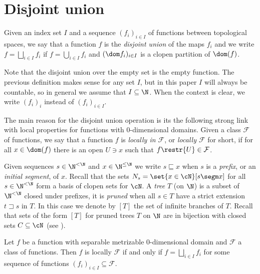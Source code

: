\section{Disjoint union}


\begin{definition}
Given an index set $I$ and a sequence $(f_i)_{i\in I}$ of functions between topological spaces,
we say that a function $f$ is the \emph{disjoint union} of the maps $f_i$ and we write $f=\bigsqcup_{i\in I} f_i$
if $f=\bigcup_{i\in I}f_i$ and $(\dom f_i)_{i\in I}$ is a clopen partition of $\dom(f)$.
\end{definition}

Note that the disjoint union over the empty set is the empty function.
The previous definition makes sense for any set $I$, but in this paper $I$ will always be countable, so in general we assume that $I\subseteq \N$.
When the context is clear, we write $(f_i)_i$ instead of $(f_i)_{i\in I}$.

The main reason for the disjoint union operation is its the following strong link with local properties for functions with $0$-dimensional domains.
Given a class $\mathcal{F}$ of functions, we say that a function $f$ is \emph{locally in $\mathcal{F}$}, or \emph{locally $\mathcal{F}$} for short,
if for all $x\in\dom(f)$ there is an open $U\ni x$ such that $f\restr{U}\in\mathcal{F}$.

Given sequences $s\in\N^{<\N}$ and $x\in\N^{\leq\N}$ we write $s\sqsubseteq x$ when $s$ is a \emph{prefix}, or an \emph{initial segment}, of $x$.
Recall that the sets $N_{s}=\set{x\in\cN}[s\segm x]$ for all $s\in\N^{<\N}$ form a basis of clopen sets for $\cN$.
A \emph{tree} $T$ (on $\N$) is a subset of $\N^{<\N}$ closed under prefixes, it is \emph{pruned} when all $s\in T$ have a strict extension $t\sqsupset s$ in $T$.
In this case we denote by $[T]$ the set of infinite branches of $T$.
Recall that sets of the form $[T]$ for pruned trees $T$ on $\N$ are in bijection with closed sets $C\subseteq\cN$ (see \cite[(2.4)]{kechris}).

\begin{proposition}\label{0dimanddisjointunion}
Let $f$ be a function with separable metrizable 0-dimensional domain and $\mathcal{F}$ a class of functions.
Then $f$ is locally $\mathcal{F}$ if and only if $f=\bigsqcup_{i\in I}f_i$ for some sequence of functions $(f_i)_{i\in I}\subseteq\mathcal{F}$.
\end{proposition}



